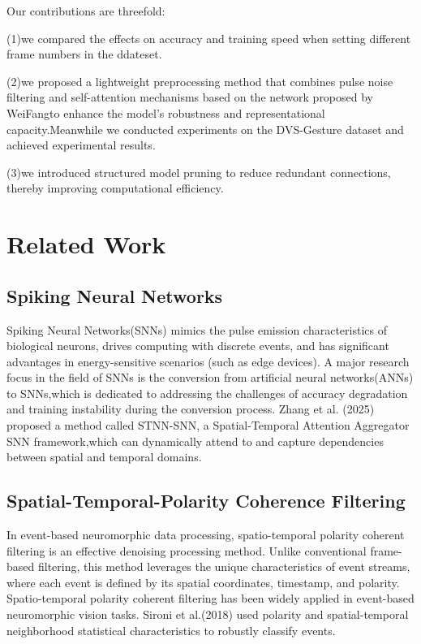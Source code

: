 \documentclass[conference]{IEEEtran}
\begin{document}
Our contributions are threefold:

(1)we compared the effects on accuracy and training speed when setting different frame numbers in the ddateset.

(2)we proposed a lightweight preprocessing method that combines pulse noise filtering and self-attention mechanisms based on the network proposed by WeiFang\cite{fang2021}to enhance the model's robustness and representational capacity.Meanwhile we conducted experiments on the DVS-Gesture dataset and achieved experimental results.

(3)we introduced structured model pruning to reduce redundant connections, thereby improving computational efficiency.


\section{Related Work}
\subsection{Spiking Neural Networks}
Spiking Neural Networks(SNNs) mimics the pulse emission characteristics of biological neurons, drives computing with discrete events, and has significant advantages in energy-sensitive scenarios (such as edge devices).\cite{roy2019towards} A major research focus in the field of SNNs is the conversion from artificial neural networks(ANNs) to SNNs\cite{rueckauer2017conversion},which is dedicated to addressing the challenges of accuracy degradation and training instability during the conversion process.\cite{han2020rmp} Zhang et al. (2025) proposed a method called STNN-SNN, a Spatial-Temporal Attention Aggregator SNN framework,which can dynamically attend to and capture dependencies between spatial and temporal domains.\cite{zhang2025}

\subsection{Spatial-Temporal-Polarity Coherence Filtering}
In event-based neuromorphic data processing, spatio-temporal polarity coherent filtering is an effective denoising processing method. Unlike conventional frame-based filtering, this method leverages the unique characteristics of event streams, where each event is defined by its spatial coordinates, timestamp, and polarity. Spatio-temporal polarity coherent filtering has been widely applied in event-based neuromorphic vision tasks. Sironi et al.(2018) used polarity and spatial-temporal neighborhood statistical characteristics to robustly classify events.\cite{8578284} 
\end{document}
